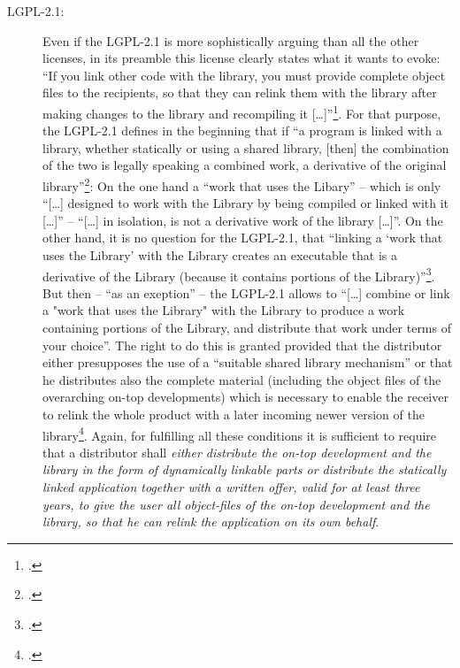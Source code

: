\begin{description}
  \item[LGPL-2.1:] Even if the LGPL-2.1 is more sophistically arguing than all
  the other licenses, in its preamble this license clearly states what it wants
  to evoke: \enquote{If you link other code with the library, you must provide
  complete object files to the recipients, so that they can relink them with the
  library after making changes to the library and recompiling it
  [\ldots]}\footcite[cf.][\nopage wp.\ preamble]{Lgpl21OsiLicense1999a}. For
  that purpose, the LGPL-2.1 defines in the beginning that if \enquote{a program
  is linked with a library, whether statically or using a shared library, [then]
  the combination of the two is legally speaking a combined work, a derivative
  of the original library}\footcite[cf.][\nopage wp.\
  preamble]{Lgpl21OsiLicense1999a}: On the one hand a \enquote{work that uses
  the Libary} -- which is only \enquote{[\ldots] designed to work with the
  Library by being compiled or linked with it [\ldots]} -- \enquote{[\ldots] in
  isolation, is not a derivative work of the library [\ldots]}. On the other
  hand, it is no question for the LGPL-2.1, that \enquote{linking a
  \enquote{work that uses the Library} with the Library creates an executable
  that is a derivative of the Library (because it contains portions of the
  Library)}\footcite[cf.][\nopage wp.\ §5]{Lgpl21OsiLicense1999a}. But then --
  \enquote{as an exeption} -- the LGPL-2.1 allows to \enquote{[\ldots] combine
  or link a "work that uses the Library" with the Library to produce a work
  containing portions of the Library, and distribute that work under terms of
  your choice}. The right to do this is granted provided that the distributor
  either presupposes the use of a \enquote{suitable shared library mechanism} or
  that he distributes also the complete material (including the object files of
  the overarching on-top developments) which is necessary to enable the receiver
  to relink the whole product with a later incoming newer version of the
  library\footcite[cf.][\nopage wp.\ §6, §6b and §6c together with
  §6c]{Lgpl21OsiLicense1999a}. Again, for fulfilling all these conditions it is
  sufficient to require that a distributor shall \emph{either distribute the
  on-top development and the library in the form of dynamically linkable parts
  or distribute the statically linked application together with a written offer,
  valid for at least three years, to give the user all object-files of the
  on-top development and the library, so that he can relink the application on
  its own behalf}.

\end{description}

